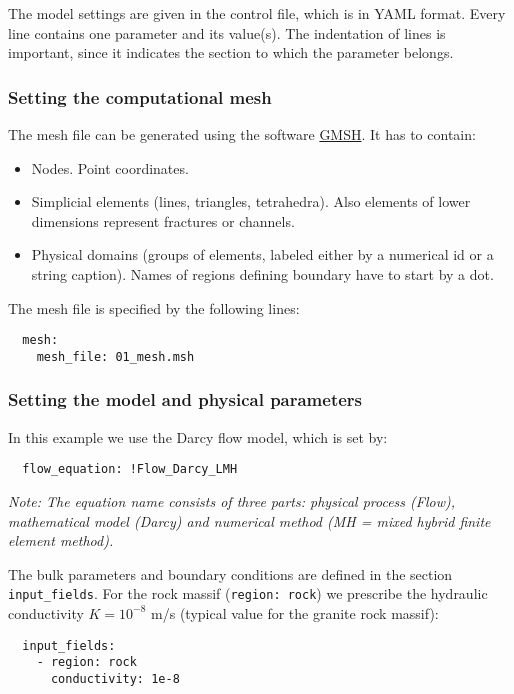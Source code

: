The model settings are given in the control file, which is in YAML
format. Every line contains one parameter and its value(s). The
indentation of lines is important, since it indicates the section to
which the parameter belongs.

\subsubsection{Setting the computational mesh}

The mesh file can be generated using the software
\href{http://www.gmsh.info}{GMSH}. It has to contain:

\begin{itemize}
\tightlist
\item
  Nodes. Point coordinates.
\item
  Simplicial elements (lines, triangles, tetrahedra). Also elements of
  lower dimensions represent fractures or channels.
\item
  Physical domains (groups of elements, labeled either by a numerical id
  or a string caption). Names of regions defining boundary have to start
  by a dot.
\end{itemize}

The mesh file is specified by the following lines:

\begin{verbatim}
  mesh:
    mesh_file: 01_mesh.msh
\end{verbatim}

\subsubsection{Setting the model and physical parameters}

In this example we use the Darcy flow model, which is set by:

\begin{verbatim}
  flow_equation: !Flow_Darcy_LMH
\end{verbatim}

\emph{Note: The equation name consists of three parts: physical process
(Flow), mathematical model (Darcy) and numerical method (MH = mixed
hybrid finite element method).}

The bulk parameters and boundary conditions are defined in the section
\texttt{input\_fields}. For the rock massif (\texttt{region:\ rock}) we
prescribe the hydraulic conductivity \(K = 10^{-8}\) m/s (typical value
for the granite rock massif):

\begin{verbatim}
  input_fields:
    - region: rock
      conductivity: 1e-8
\end{verbatim}

